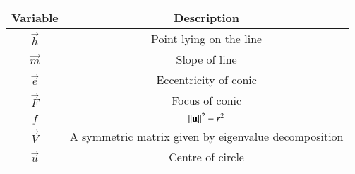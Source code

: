 \begin{tabular}[12pt]{ |c| c|}
    \hline
    \textbf{Variable} & \textbf{Description}\\ 
    \hline
	$\vec{h}$ & Point lying on the line\\
	\hline
	$\vec{m}$ & Slope of line\\
	\hline
	$\vec{e}$ & Eccentricity of conic\\
	\hline
	$\vec{F}$ & Focus of conic\\
	\hline
	$f$ & $\left\lVert\mathbf{u}\right\rVert^2-r^2$\\
	\hline
	$\vec{V}$ & A symmetric matrix given by eigenvalue decomposition\\
	\hline
	$\vec{u}$ & Centre of circle\\
	\hline
\end{tabular}
